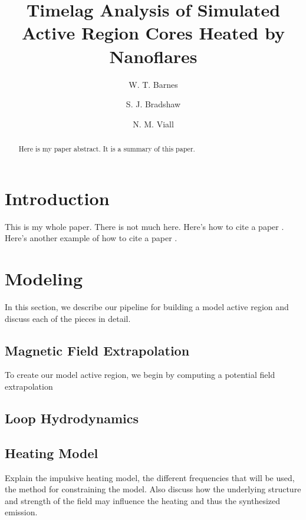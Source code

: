 \documentclass[modern,linenumbers]{aastex62}
\begin{document}
\title{Timelag Analysis of Simulated Active Region Cores Heated by Nanoflares}

\author[0000-0001-9642-6089]{W. T. Barnes}
\author{S. J. Bradshaw}
\author{N. M. Viall}

\begin{abstract}
Here is my paper abstract. It is a summary of this paper.
\end{abstract}



\section{Introduction}\label{introduction}

This is my whole paper. There is not much here. Here's how to cite a
paper \citet{viall_evidence_2012}. Here's another example of how to cite
a paper \citep{warren_constraints_2011}.


\section{Modeling}
\label{modeling}
In this section, we describe our pipeline for building a model active region and discuss each of the pieces in detail.

\subsection{Magnetic Field Extrapolation}
\label{field}

To create our model active region, we begin by computing a potential field extrapolation 

\subsection{Loop Hydrodynamics}
\label{loops}


\subsection{Heating Model}
\label{heating}
Explain the impulsive heating model, the different frequencies that will be used, the method for constraining the model. Also discuss how the underlying structure and strength of the field may influence the heating and thus the synthesized emission.
\end{document}
